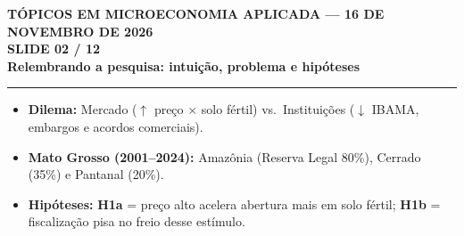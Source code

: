 \documentclass[11pt,a4paper]{article}
\newcommand{\slidenum}{1}
\begin{document}
\newpage

\renewcommand{\slidenum}{2}
\noindent
\begin{minipage}{\textwidth}
\begin{center}
{\color{cinza}\footnotesize\textbf{TÓPICOS EM MICROECONOMIA APLICADA --- 16 DE NOVEMBRO DE 2026}\\[1.2mm]}
{\color{cinza}\bfseries\Large SLIDE 02 / 12\\[1.5mm]}
{\color{verde}\bfseries\LARGE Relembrando a pesquisa: intuição, problema e hipóteses\\[2.5mm]}
\rule{\textwidth}{1pt}
\end{center}
\end{minipage}
\vspace{1.5mm}

\begin{tcolorbox}[title={\bfseries\small ÂNCORAS DO SLIDE}]
\begin{itemize}[leftmargin=*,itemsep=1mm,topsep=0.5mm]
    \item \textbf{Dilema:} Mercado ($\uparrow$ preço $\times$ solo fértil) vs.\ Instituições ($\downarrow$ IBAMA, embargos e acordos comerciais).
    \item \textbf{Mato Grosso (2001--2024):} Amazônia (Reserva Legal 80\%), Cerrado (35\%) e Pantanal (20\%).
    \item \textbf{Hipóteses:} \textbf{H1a} = preço alto acelera abertura mais em solo fértil; \textbf{H1b} = fiscalização pisa no freio desse estímulo.
\end{itemize}
\end{tcolorbox}
\vspace{2mm}
\end{document}

